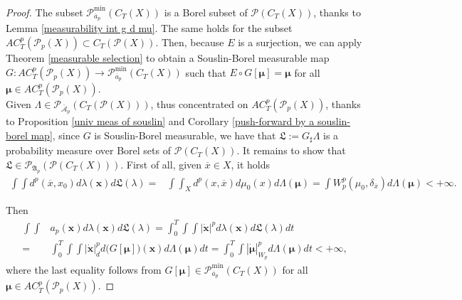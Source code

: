 \documentclass[10pt,leqno]{amsart}
\numberwithin{equation}{section}
\newcommand{\PP}{\mathcal{P}}
\begin{document}
\begin{proof}
The subset $\PP_{\overline{a}_p}^{\operatorname{min}}(C_T(X))$ is a Borel subset of $\PP(C_T(X))$, thanks to Lemma \ref{measurability int g d mu}. The same holds for the subset $AC_T^p(\PP_p(X))\subset C_T(\PP(X))$. Then, because $E$ is a surjection, we can apply Theorem \ref{measurable selection} to obtain a Souslin-Borel measurable map $G:AC_T^p(\PP_p(X)) \to \PP_{\overline{a}_p}^{\operatorname{min}}(C_T(X))$ such that $E\circ G[\boldsymbol{\mu}] = \boldsymbol{\mu}$ for all $\boldsymbol{\mu} \in AC_T^p(\PP_p(X))$.
\\
Given $\Lambda\in \PP_{\bar{\mathcal{A}}_p}(C_T(\PP(X)))$, thus concentrated on $AC_T^p(\PP_p(X))$, thanks to Proposition \ref{univ meas of souslin} and Corollary \ref{push-forward by a souslin-borel map}, since $G$ is Souslin-Borel measurable, we have that 
    \(\mathfrak{L}:= G_{\sharp }\Lambda\)
    is a probability measure over Borel sets of $\mathcal{P}(C_T(X))$.
    It remains to show that $\mathfrak{L} \in \PP_{\mathfrak{A}_p}(\mathcal{P}(C_T(X)))$. First of all, given $\overline{x}\in X$, it holds
    \[
    \begin{aligned}\int\int d^p(\overline{x},x_0) d\lambda(\boldsymbol{x})d\mathfrak{L}(\lambda) = & \int\int_X d^p(x,\overline{x})d\mu_0(x)d\Lambda(\boldsymbol{\mu}) 
    =  \int W_p^p(\mu_0,\delta_{\overline{x}}) d\Lambda(\boldsymbol{\mu})<+\infty.
    \end{aligned}\]
    
    \noindent Then 
    \begin{equation}\label{equality energy}
        \begin{aligned}
        \int \int &a_p(\boldsymbol{x}) d\lambda(\boldsymbol{x}) d\mathfrak{L}(\lambda) = 
        \int_0^T \int\int|\dot{\boldsymbol{x}}|^p d\lambda(\boldsymbol{x})d\mathfrak{L}(\lambda)dt 
        \\
        = & \int_0^T \int\int|\dot{\boldsymbol{x}}|_d^p d\big(G[\boldsymbol{\mu}]\big)(\boldsymbol{x})d\Lambda(\boldsymbol{\mu})dt
        =  \int_0^T \int |\dot{\boldsymbol{\mu}}|^p_{W_{p}}d\Lambda(\boldsymbol{\mu}) dt <+\infty,
    \end{aligned}
    \end{equation}
    where the last equality follows from $G[\boldsymbol{\mu}] \in \PP_{\overline{a}_p}^{\operatorname{min}}(C_T(X))$ for all $\boldsymbol{\mu}\in AC_T^p(\PP_p(X))$.
\end{proof}
\end{document}
